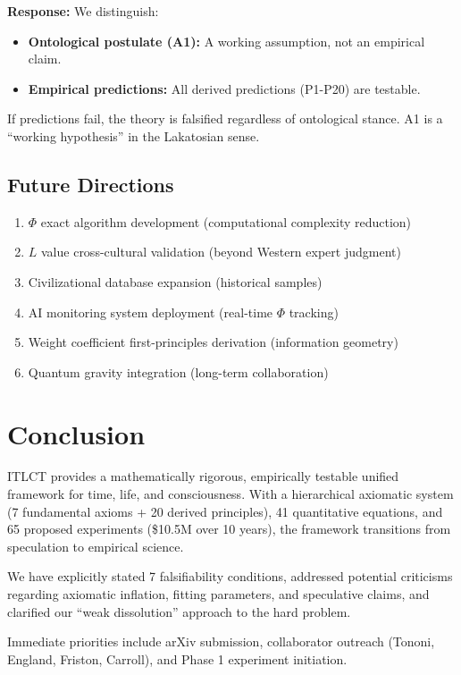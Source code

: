 \documentclass[12pt,a4paper]{article}
\begin{document}
\textbf{Response:} We distinguish:
\begin{itemize}
\item \textbf{Ontological postulate (A1):} A working assumption, not an empirical claim.
\item \textbf{Empirical predictions:} All derived predictions (P1-P20) are testable.
\end{itemize}
If predictions fail, the theory is falsified regardless of ontological stance. A1 is a ``working hypothesis'' in the Lakatosian sense.

\subsection{Future Directions}

\begin{enumerate}
\item $\Phi$ exact algorithm development (computational complexity reduction)
\item $L$ value cross-cultural validation (beyond Western expert judgment)
\item Civilizational database expansion (historical samples)
\item AI monitoring system deployment (real-time $\Phi$ tracking)
\item Weight coefficient first-principles derivation (information geometry)
\item Quantum gravity integration (long-term collaboration)
\end{enumerate}

\section{Conclusion}

ITLCT provides a mathematically rigorous, empirically testable unified framework for time, life, and consciousness. With a hierarchical axiomatic system (7 fundamental axioms + 20 derived principles), 41 quantitative equations, and 65 proposed experiments (\$10.5M over 10 years), the framework transitions from speculation to empirical science.

We have explicitly stated 7 falsifiability conditions, addressed potential criticisms regarding axiomatic inflation, fitting parameters, and speculative claims, and clarified our ``weak dissolution'' approach to the hard problem.

Immediate priorities include arXiv submission, collaborator outreach (Tononi, England, Friston, Carroll), and Phase 1 experiment initiation.
\end{document}
